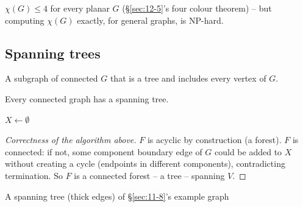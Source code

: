 \documentclass[11pt]{article}
\begin{document}
\begin{note}
$\chi(G)\le4$ for every planar $G$ (\S\ref{sec:12-5}'s four colour theorem) -- but computing $\chi(G)$ exactly, for general graphs, is NP-hard.
\end{note}

\subsection{Spanning trees}
\label{sec:12-4}

\begin{definition}
A subgraph of connected $G$ that is a tree and includes every vertex of $G$.
\end{definition}

\begin{theorem}[Existence]
Every connected graph has a spanning tree.
\end{theorem}

\begin{algorithm}[H]
\SetAlgoLined
{}
$X\gets\emptyset$\;
\caption{Spanning tree via edge addition}
\end{algorithm}

\begin{proof}[Correctness of the algorithm above]
$F$ is acyclic by construction (a forest). $F$ is connected: if not, some component boundary edge of $G$ could be added to $X$ without creating a cycle (endpoints in different components), contradicting termination. So $F$ is a connected forest -- a tree -- spanning $V$.
\end{proof}

\begin{center}
\end{center}
\begin{center}
\small A spanning tree (thick edges) of \S\ref{sec:11-8}'s example graph
\end{center}
\end{document}
